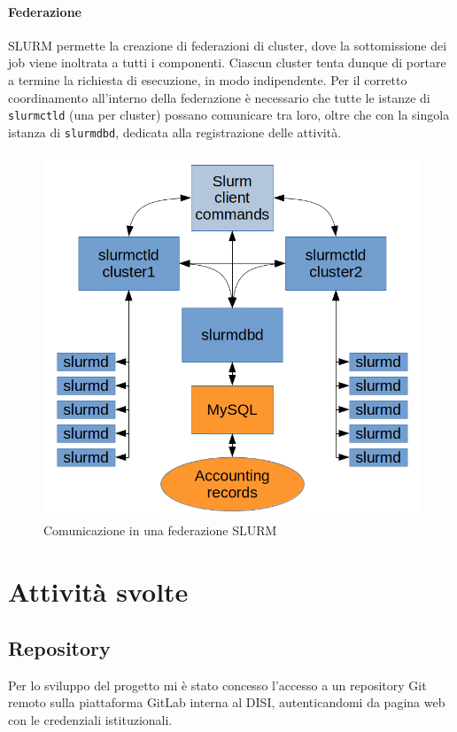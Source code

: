\documentclass[12pt,a4paper,twoside,openright]{book}
\begin{document}
\subsubsection{Federazione}
\ac{SLURM} permette la creazione di federazioni di cluster, dove la sottomissione dei job viene inoltrata a tutti i componenti. Ciascun cluster tenta dunque di portare a termine la richiesta di esecuzione, in modo indipendente. Per il corretto coordinamento all'interno della federazione è necessario che tutte le istanze di \texttt{slurmctld} (una per cluster) possano comunicare tra loro, oltre che con la singola istanza di \texttt{slurmdbd}, dedicata alla registrazione delle attività.
\begin{figure}[ht]
    \centering
    \includegraphics[width=0.55\linewidth]{images/network_federation.png}
    \caption{Comunicazione in una federazione \ac{SLURM}}
    \label{fig:slurm-federation-network}
\end{figure}


\chapter{\textbf{Attività svolte}} %
\section{Repository}
Per lo sviluppo del progetto mi è stato concesso l'accesso a un repository Git remoto sulla piattaforma GitLab interna al \ac{DISI}, autenticandomi da pagina web con le credenziali istituzionali.
\end{document}
